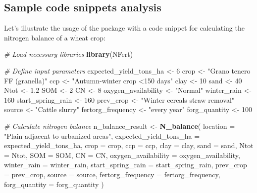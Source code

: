 \documentclass[
  11pt,
]{article}
\newenvironment{Shaded}{\begin{snugshade}}{\end{snugshade}}
\newcommand{\AttributeTok}[1]{\textcolor[rgb]{0.13,0.29,0.53}{#1}}
\newcommand{\CommentTok}[1]{\textcolor[rgb]{0.56,0.35,0.01}{\textit{#1}}}
\newcommand{\DecValTok}[1]{\textcolor[rgb]{0.00,0.00,0.81}{#1}}
\newcommand{\FloatTok}[1]{\textcolor[rgb]{0.00,0.00,0.81}{#1}}
\newcommand{\FunctionTok}[1]{\textcolor[rgb]{0.13,0.29,0.53}{\textbf{#1}}}
\newcommand{\NormalTok}[1]{#1}
\newcommand{\OtherTok}[1]{\textcolor[rgb]{0.56,0.35,0.01}{#1}}
\newcommand{\StringTok}[1]{\textcolor[rgb]{0.31,0.60,0.02}{#1}}
\begin{document}
\subsection{Sample code snippets
analysis}\label{sample-code-snippets-analysis}

Let's illustrate the usage of the package with a code snippet for
calculating the nitrogen balance of a wheat crop:

\begin{Shaded}
\begin{Highlighting}[]
\CommentTok{\# Load necessary libraries}
\FunctionTok{library}\NormalTok{(NFert)}

\CommentTok{\# Define input parameters}
\NormalTok{expected\_yield\_tons\_ha }\OtherTok{\textless{}{-}} \DecValTok{6}
\NormalTok{crop }\OtherTok{\textless{}{-}} \StringTok{"Grano tenero FF (granella)"}
\NormalTok{ccp }\OtherTok{\textless{}{-}} \StringTok{"Autumn{-}winter crop \textless{}150 days"}
\NormalTok{clay }\OtherTok{\textless{}{-}} \DecValTok{10}
\NormalTok{sand }\OtherTok{\textless{}{-}} \DecValTok{40}
\NormalTok{Ntot }\OtherTok{\textless{}{-}} \FloatTok{1.2}
\NormalTok{SOM }\OtherTok{\textless{}{-}} \DecValTok{2}
\NormalTok{CN }\OtherTok{\textless{}{-}} \DecValTok{8}
\NormalTok{oxygen\_availability }\OtherTok{\textless{}{-}} \StringTok{"Normal"}
\NormalTok{winter\_rain }\OtherTok{\textless{}{-}} \DecValTok{160}
\NormalTok{start\_spring\_rain }\OtherTok{\textless{}{-}} \DecValTok{160}
\NormalTok{prev\_crop }\OtherTok{\textless{}{-}} \StringTok{"Winter cereals straw removal"}
\NormalTok{source }\OtherTok{\textless{}{-}} \StringTok{"Cattle slurry"}
\NormalTok{fertorg\_frequency }\OtherTok{\textless{}{-}} \StringTok{"every year"}
\NormalTok{forg\_quantity }\OtherTok{\textless{}{-}} \DecValTok{100}

\CommentTok{\# Calculate nitrogen balance}
\NormalTok{n\_balance\_result }\OtherTok{\textless{}{-}} \FunctionTok{N\_balance}\NormalTok{(}
  \AttributeTok{location =} \StringTok{"Plain adjacent to urbanized areas"}\NormalTok{,}
  \AttributeTok{expected\_yield\_tons\_ha =}\NormalTok{ expected\_yield\_tons\_ha,}
  \AttributeTok{crop =}\NormalTok{ crop,}
  \AttributeTok{ccp =}\NormalTok{ ccp,}
  \AttributeTok{clay =}\NormalTok{ clay,}
  \AttributeTok{sand =}\NormalTok{ sand,}
  \AttributeTok{Ntot =}\NormalTok{ Ntot,}
  \AttributeTok{SOM =}\NormalTok{ SOM,}
  \AttributeTok{CN =}\NormalTok{ CN,}
  \AttributeTok{oxygen\_availability =}\NormalTok{ oxygen\_availability,}
  \AttributeTok{winter\_rain =}\NormalTok{ winter\_rain,}
  \AttributeTok{start\_spring\_rain =}\NormalTok{ start\_spring\_rain,}
  \AttributeTok{prev\_crop =}\NormalTok{ prev\_crop,}
  \AttributeTok{source =}\NormalTok{ source,}
  \AttributeTok{fertorg\_frequency =}\NormalTok{ fertorg\_frequency,}
  \AttributeTok{forg\_quantity =}\NormalTok{ forg\_quantity}
\NormalTok{)}


\end{Highlighting}
\end{Shaded}
\end{document}
